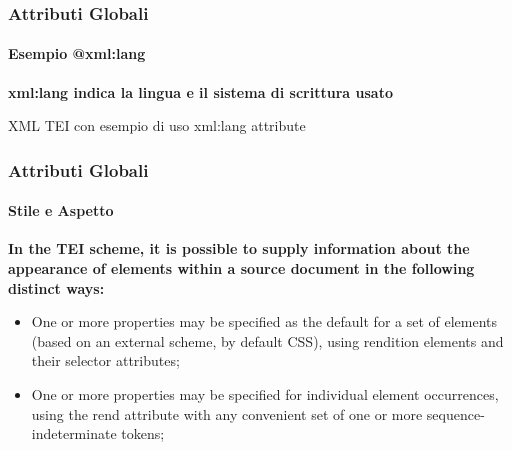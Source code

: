 \begin{frame} [fragile]
    \frametitle{Attributi Globali}
    \framesubtitle{Esempio \textrm{@xml:lang}}
    \addtocounter{nframe}{1}

    \textbf{\textrm{xml:lang} indica la lingua e il sistema di scrittura usato}
        \begin{block}{XML TEI con esempio di uso \textrm{xml:lang} attribute}
            {\langatt}
        \end{block}
\end{frame}


\begin{frame}
    \frametitle{Attributi Globali}
    \framesubtitle{Stile e Aspetto}
    \addtocounter{nframe}{1}

    
    \textbf{In the TEI scheme, it is possible to supply information about the appearance of elements within a source document in the following distinct ways:}

    \begin{itemize}
        \item One or more properties may be specified as the default for a set of elements (based on an external scheme, by default CSS), using rendition elements and their selector attributes;
        \item One or more properties may be specified for individual element occurrences, using the rend attribute with any convenient set of one or more sequence-indeterminate tokens;
    \end{itemize}
\end{frame}

